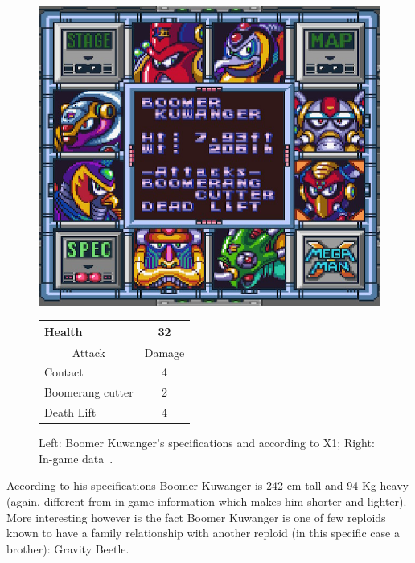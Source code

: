 \begin{figure}[htp]
	\begin{minipage}[c]{0.45\linewidth}
		\vspace{0pt}
		\centering
		\includegraphics[width=\linewidth]{figures/X1/Boomer_kuwanger/Boomer_kuwanger_specs.png}
	\end{minipage}
	\begin{minipage}[c]{0.45\linewidth}
		\centering
		\vspace{0pt}
		\begin{tabular}[h]{l c}
			\toprule
			Health  & 32\\
			\midrule
			\multicolumn{1}{c}{Attack} & \multicolumn{1}{c}{Damage}\\
			Contact & 4\\
			Boomerang cutter& 2\\
			Death Lift & 4\\
			\bottomrule
		\end{tabular}
	\end{minipage}
	\caption{Left: Boomer Kuwanger's specifications and according to X1; Right: In-game data~\cite{wiki:Boomer_kuwanger}. }
	\label{Kuwanger_specs}
\end{figure}

According to his specifications Boomer Kuwanger is 242 cm tall and 94 Kg heavy (again, different from in-game information which makes him shorter and lighter). More interesting however is the fact Boomer Kuwanger is one of few reploids known to have a family relationship with another reploid (in this specific case a brother): Gravity Beetle.%

